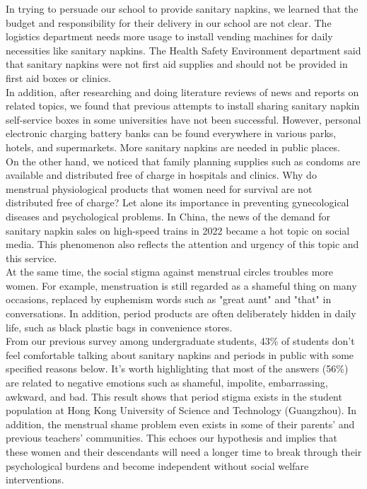In trying to persuade our school to provide sanitary napkins, we learned that the budget and responsibility for their delivery in our school are not clear. The logistics department needs more usage to install vending machines for daily necessities like sanitary napkins. The Health Safety Environment department said that sanitary napkins were not first aid supplies and should not be provided in first aid boxes or clinics.\\

In addition, after researching and doing literature reviews of news and reports on related topics, we found that previous attempts to install sharing sanitary napkin self-service boxes in some universities have not been successful. However, personal electronic charging battery banks can be found everywhere in various parks, hotels, and supermarkets. More sanitary napkins are needed in public places.\\

On the other hand, we noticed that family planning supplies such as condoms are available and distributed free of charge in hospitals and clinics. Why do menstrual physiological products that women need for survival are not distributed free of charge? Let alone its importance in preventing gynecological diseases and psychological problems. In China, the news of the demand for sanitary napkin sales on high-speed trains in 2022 became a hot topic on social media. This phenomenon also reflects the attention and urgency of this topic and this service.\\

At the same time, the social stigma against menstrual circles troubles more women. For example, menstruation is still regarded as a shameful thing on many occasions, replaced by euphemism words such as "great aunt" and "that" in conversations. In addition, period products are often deliberately hidden in daily life, such as black plastic bags in convenience stores.\\

From our previous survey among undergraduate students, 43\% of students don't feel comfortable talking about sanitary napkins and periods in public with some specified reasons below. It's worth highlighting that most of the answers (56\%) are related to negative emotions such as shameful, impolite, embarrassing, awkward, and bad. This result shows that period stigma exists in the student population at Hong Kong University of Science and Technology (Guangzhou). In addition, the menstrual shame problem even exists in some of their parents' and previous teachers' communities. This echoes our hypothesis and implies that these women and their descendants will need a longer time to break through their psychological burdens and become independent without social welfare interventions.


